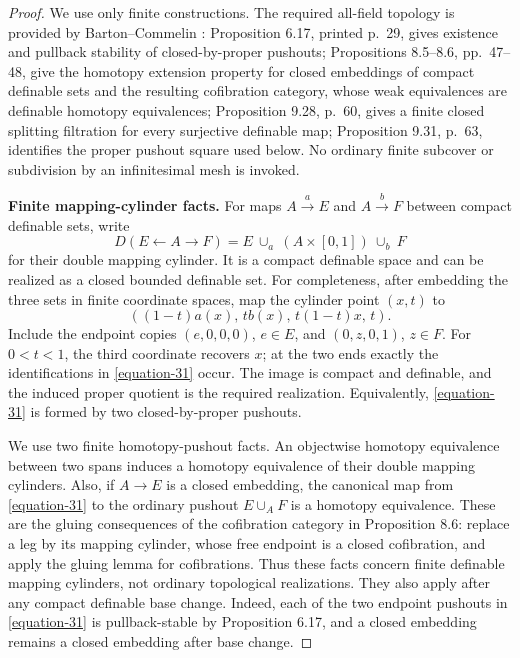 \documentclass[11pt,a4paper]{article}
\theoremstyle{definition}
\begin{document}
\begin{proof}
We use only finite constructions. The required all-field topology is provided by Barton--Commelin \cite{BartonCommelin2021}: Proposition 6.17, printed p.~29, gives existence and pullback stability of closed-by-proper pushouts; Propositions 8.5--8.6, pp.~47--48, give the homotopy extension property for closed embeddings of compact definable sets and the resulting cofibration category, whose weak equivalences are definable homotopy equivalences; Proposition 9.28, p.~60, gives a finite closed splitting filtration for every surjective definable map; Proposition 9.31, p.~63, identifies the proper pushout square used below. No ordinary finite subcover or subdivision by an infinitesimal mesh is invoked.

\textbf{Finite mapping-cylinder facts.}
For maps \(A\xrightarrow{a}E\) and \(A\xrightarrow{b}F\) between compact definable sets, write
\begin{equation}
 D(E\leftarrow A\to F)=
 E\ \cup_a\ (A\times[0,1])\ \cup_b\ F
 \label{equation-31}
\end{equation}
for their double mapping cylinder. It is a compact definable space and can be realized as a closed bounded definable set. For completeness, after embedding the three sets in finite coordinate spaces, map the cylinder point \((x,t)\) to
\begin{equation}
 ((1-t)a(x),\,t b(x),\,t(1-t)x,\,t).
 \label{equation-32}
\end{equation}
Include the endpoint copies \((e,0,0,0)\), \(e\in E\), and \((0,z,0,1)\), \(z\in F\). For \(0<t<1\), the third coordinate recovers \(x\); at the two ends exactly the identifications in \eqref{equation-31} occur. The image is compact and definable, and the induced proper quotient is the required realization. Equivalently, \eqref{equation-31} is formed by two closed-by-proper pushouts.

We use two finite homotopy-pushout facts. An objectwise homotopy equivalence between two spans induces a homotopy equivalence of their double mapping cylinders. Also, if \(A\to E\) is a closed embedding, the canonical map from \eqref{equation-31} to the ordinary pushout \(E\cup_AF\) is a homotopy equivalence. These are the gluing consequences of the cofibration category in Proposition 8.6: replace a leg by its mapping cylinder, whose free endpoint is a closed cofibration, and apply the gluing lemma for cofibrations. Thus these facts concern finite definable mapping cylinders, not ordinary topological realizations. They also apply after any compact definable base change. Indeed, each of the two endpoint pushouts in \eqref{equation-31} is pullback-stable by Proposition 6.17, and a closed embedding remains a closed embedding after base change.


\end{proof}
\end{document}
